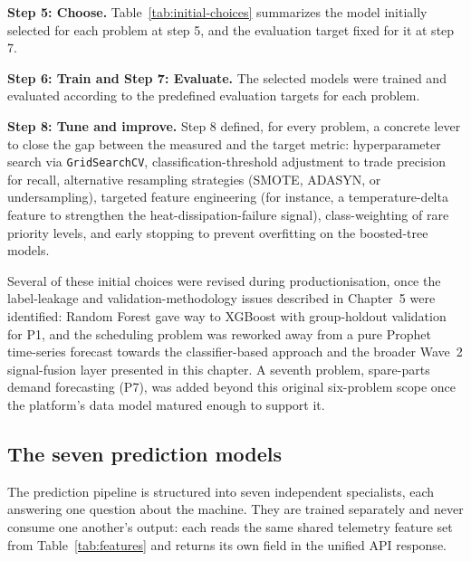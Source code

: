 \textbf{Step 5: Choose.} Table~\ref{tab:initial-choices} summarizes the model initially selected for each problem at step 5, and the evaluation target fixed for it at step 7.

\textbf{Step 6: Train and Step 7: Evaluate.} The selected models were trained and evaluated according to the predefined evaluation targets for each problem.

\textbf{Step 8: Tune and improve.} Step 8 defined, for every problem, a concrete lever to close the gap between the measured and the target metric: hyperparameter search via \texttt{GridSearchCV}, classification-threshold adjustment to trade precision for recall, alternative resampling strategies (SMOTE, ADASYN, or undersampling), targeted feature engineering (for instance, a temperature-delta feature to strengthen the heat-dissipation-failure signal), class-weighting of rare priority levels, and early stopping to prevent overfitting on the boosted-tree models.

Several of these initial choices were revised during productionisation, once the label-leakage and validation-methodology issues described in Chapter~5 were identified: Random Forest gave way to XGBoost with group-holdout validation for P1, and the scheduling problem was reworked away from a pure Prophet time-series forecast towards the classifier-based approach and the broader Wave~2 signal-fusion layer presented in this chapter. A seventh problem, spare-parts demand forecasting (P7), was added beyond this original six-problem scope once the platform's data model matured enough to support it.

\subsection{The seven prediction models}

The prediction pipeline is structured into seven independent specialists, each answering one question about the machine. They are trained separately and never consume one another's output: each reads the same shared telemetry feature set from Table~\ref{tab:features} and returns its own field in the unified API response.

